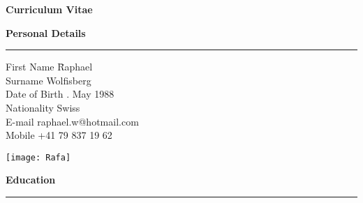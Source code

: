 



\graphicspath{{./Pictures/}}


\newpage
\pagestyle{plain}
\vspace{-9cm}

\LARGE
\textbf{Curriculum Vitae}

\bigskip
\bigskip
\Large
\textbf{Personal Details}
\noindent\rule[0mm]{\linewidth}{2pt}

\normalsize
\begin{tabbing}
First Name \hspace*{2.4cm} \= Raphael \\
Surname \> Wolfisberg \\
Date of Birth . May 1988 \\
Nationality \> Swiss \\
\medskip
E-mail \> raphael.w@hotmail.com \\
Mobile \> +41 79 837 19 62 
\end{tabbing}

\vspace{-4.4cm}
\begin{flushright}
\texttt{[image: Rafa]} \\[1cm]
\end{flushright}


\vspace{-0.8cm}
\Large
\textbf{Education}
\noindent\rule[0mm]{\linewidth}{2pt}

